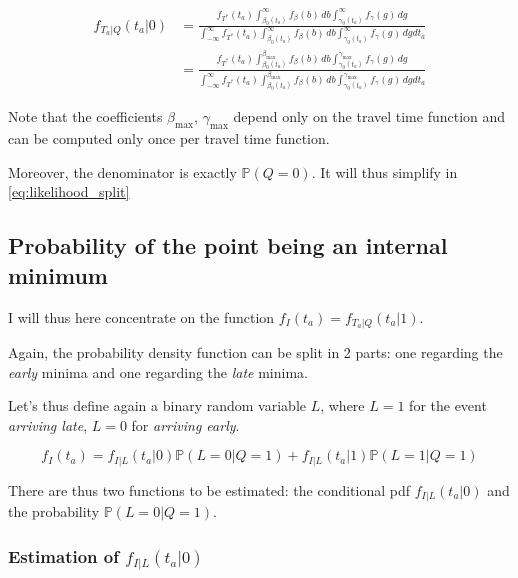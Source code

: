 \documentclass{article}
\begin{document}
\begin{align*}
  f_{T_a | Q}(t_a | 0) & = \frac{f_{T^*}(t_a)\int_{\beta_0(t_a)}^\infty f_\beta(b)\, db\int_{\gamma_0(t_a)}^\infty f_\gamma(g)\, dg}{\int_{-\infty}^\infty f_{T^*}(t_a)\int_{\beta_0(t_a)}^\infty f_\beta(b)\, db\int_{\gamma_0(t_a)}^\infty f_\gamma(g)\, dgdt_a} \\
  & = \frac{f_{T^*}(t_a)\int_{\beta_0(t_a)}^{\beta_\text{max}}f_\beta(b)\, db\int_{\gamma_0(t_a)}^{\gamma_\text{max}}f_\gamma(g)\, dg}{\int_{-\infty}^\infty f_{T^*}(t_a)\int_{\beta_0(t_a)}^{\beta_\text{max}}f_\beta(b)\, db\int_{\gamma_0(t_a)}^{\gamma_\text{max}}f_\gamma(g)\, dgdt_a}\tag{\theequation}\label{eq:on_time}
\end{align*}

Note that the coefficients \(\beta_\text{max}\), \(\gamma_\text{max}\) depend only on the travel time function and can be computed only once per travel time function.

Moreover, the denominator is exactly \(\mathbb{P}(Q = 0)\).
It will thus simplify in \eqref{eq:likelihood_split}

\subsection{Probability of the point being an internal minimum}

I will thus here concentrate on the function \(f_I(t_a) = f_{T_a | Q}(t_a | 1)\).

Again, the probability density function can be split in 2 parts:
one regarding the \textit{early} minima and one regarding the \textit{late} minima.

Let's thus define again a binary random variable \(L\), where \(L=1\) for the event \textit{arriving late}, \(L=0\) for \textit{arriving early}.

\begin{equation}
  \label{eq:internal_split}
  f_I(t_a) = f_{I | L}(t_a | 0) \mathbb{P}(L=0 | Q=1) + f_{I | L}(t_a | 1) \mathbb{P}(L=1 | Q=1)
\end{equation}

There are thus two functions to be estimated:
the conditional pdf \(f_{I | L}(t_a | 0)\) and the probability \(\mathbb{P}(L=0 | Q=1)\).

\subsubsection{Estimation of $f_{I | L}(t_a | 0)$}
\end{document}
